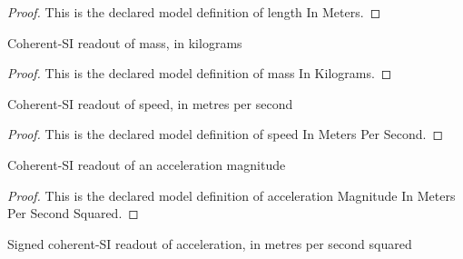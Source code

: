 \begin{proof}
  This is the declared model definition of length In Meters.
\end{proof}
\begin{definition}
  \label{def:physics:phyx-mini-0981:phyxminiproblems-problemphyxmini0981-massinkilograms}
  Coherent-SI readout of mass, in kilograms
\end{definition}
\begin{proof}
  This is the declared model definition of mass In Kilograms.
\end{proof}
\begin{definition}
  \label{def:physics:phyx-mini-0981:phyxminiproblems-problemphyxmini0981-speedinmeterspersecond}
  Coherent-SI readout of speed, in metres per second
\end{definition}
\begin{proof}
  This is the declared model definition of speed In Meters Per Second.
\end{proof}
\begin{definition}
  \label{def:physics:phyx-mini-0981:phyxminiproblems-problemphyxmini0981-accelerationmagnitudeinmeterspersecondsquared}
  Coherent-SI readout of an acceleration magnitude
\end{definition}
\begin{proof}
  This is the declared model definition of acceleration Magnitude In Meters Per Second Squared.
\end{proof}
\begin{definition}
  \label{def:physics:phyx-mini-0981:phyxminiproblems-problemphyxmini0981-accelerationinmeterspersecondsquared}
  Signed coherent-SI readout of acceleration, in metres per second squared
\end{definition}
